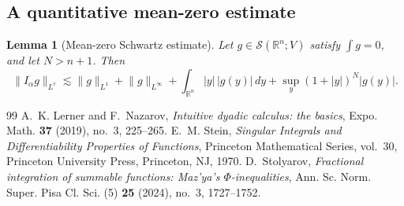 \documentclass[10pt,a4paper]{amsart}
\numberwithin{equation}{section}
\newtheorem{lemma}[theorem]{Lemma}
\newcommand{\R}{\mathbb R}
\newcommand{\cS}{\mathcal S}
\newcommand{\norm}[1]{\lVert #1\rVert}
\begin{document}
\subsection{A quantitative mean-zero estimate}

\begin{lemma}[Mean-zero Schwartz estimate]\label{lem:mean-zero-schwartz}
Let $g\in\cS(\R^n;V)$ satisfy $\int g=0$, and let $N>n+1$.  Then
\begin{equation}\label{eq:mean-zero-schwartz}
 \norm{I_\alpha g}_{L^r}
 \lesssim
 \norm{g}_{L^1}+\norm{g}_{L^\infty}
 +\int_{\R^n}|y|\,|g(y)|\,dy
 +\sup_y(1+|y|)^N|g(y)|.
\end{equation}
\end{lemma}


\begin{thebibliography}{99}
 A.~K. Lerner and F.~Nazarov, \emph{Intuitive dyadic calculus: the basics}, Expo. Math. \textbf{37} (2019), no.~3, 225--265.
 E.~M. Stein, \emph{Singular Integrals and Differentiability Properties of Functions}, Princeton Mathematical Series, vol.~30, Princeton University Press, Princeton, NJ, 1970.
 D.~Stolyarov, \emph{Fractional integration of summable functions: Maz'ya's $\Phi$-inequalities}, Ann. Sc. Norm. Super. Pisa Cl. Sci. (5) \textbf{25} (2024), no.~3, 1727--1752.
\end{thebibliography}
\end{document}

